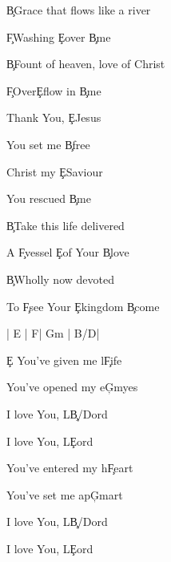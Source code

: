 \documentclass[9pt]{extarticle}
\begin{document}
\bsong

\bv
\c{B}Grace that flows like a river

\c{F\s }Washing \c{E}over \c{B}me

\c{B}Fount of heaven, love of Christ

\c{F\s }Over\c{E}flow in \c{B}me
\ev

\bc
Thank You, \c{E}Jesus

You set me \c{B}free

Christ my \c{E}Saviour

You rescued \c{B}me
\ec

\bv
\c{B}Take this life delivered

A \c{F\s }vessel \c{E}of Your \c{B}love

\c{B}Wholly now devoted

To \c{F\s }see Your \c{E}kingdom \c{B}come
\ev


\bin
| E | F\s  | G\s m |  B/D\s   |
\ein

\bb[2]
\c{E} You've given me l\c{F\s }ife

You've opened my e\c{G\s m}yes

I love You, L\c{B/D\s }ord

I love You, L\c{E}ord

You've entered my h\c{F\s }eart

You've set me ap\c{G\s m}art

I love You, L\c{B/D\s }ord

I love You, L\c{E}ord
\eb




\esong
\end{document}
